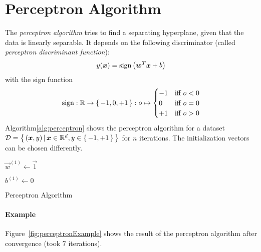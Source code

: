 	\section{Perceptron Algorithm} %
		The \emph{perceptron algorithm} tries to find a separating hyperplane, given that the data is linearly separable. It depends on the following discriminator (called \emph{perceptron discriminant function}):
		\begin{equation}
			y(\bm{x}) = \operatorname{sign}\big(\bm{w}^T \bm{x} + b\big)
		\end{equation}
		with the sign function
		\begin{equation}
			\operatorname{sign} : \mathbb{R} \to \{\, -1, 0, +1 \,\} : o \mapsto
			\begin{cases}
				-1 & \textrm{iff } o < 0 \\
				0  & \textrm{iff } o = 0 \\
				+1 & \textrm{iff } o > 0
			\end{cases}
		\end{equation}
		Algorithm\ref{alg:perceptron} shows the perceptron algorithm for a dataset \( \mathcal{D} = \big\{\, (\bm{x}, y) \,\vert\, \bm{x} \in \mathbb{R}^d, y \in \{\, -1, +1 \,\} \,\big\} \) for \(n\) iterations. The initialization vectors can be chosen differently.

		\begin{algorithm}
			\( \vec{w}^{(1)} \gets \vec{1} \)

			\( b^{(1)} \gets 0 \)


			\caption{Perceptron Algorithm}
			\label{alg:perceptron}
		\end{algorithm}

		\paragraph{Example}
			Figure~\ref{fig:perceptronExample} shows the result of the perceptron algorithm after convergence (took \(7\) iterations).

